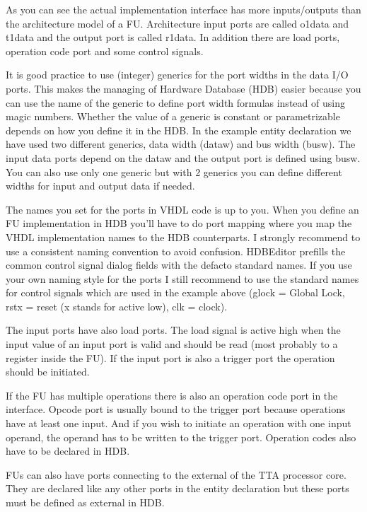\documentclass[twoside]{tceusermanual}
\begin{document}
As you can see the actual implementation interface has more inputs/outputs
than the architecture model of a FU. Architecture input ports are
called o1data and t1data and the output port is called r1data. In addition
there are load ports, operation code port and some control signals.

It is good practice to use (integer) generics for the port widths in the data
I/O ports. This makes the managing of Hardware Database (HDB) easier because
you can use the name of the generic to define port width formulas instead of
using magic numbers. Whether the value of a generic is constant or
parametrizable depends on how you define it in the HDB. In the example
entity declaration we have used two different generics, data width (dataw)
and bus width (busw). The input data ports depend on the dataw and the
output port is defined using busw. You can also use only one generic but
with 2 generics you can define different widths for input and output data if
needed.

The names you set for the ports in VHDL code is up to you. When you define
an FU implementation in HDB you'll have to do port mapping where you map the
VHDL implementation names to the HDB counterparts. I strongly recommend to
use a consistent naming convention to avoid confusion. HDBEditor prefills 
the common control signal dialog fields with the defacto standard
names. If you use your own naming style for the ports I still recommend to
use the standard names for control signals which are used in the example
above (glock = Global Lock, rstx = reset (x stands for active low), clk =
clock).

The input ports have also load ports. The load signal is active high when the
input value of an input port is valid and should be read (most probably to a
register inside the FU). If the input port is also a trigger port the
operation should be initiated.

If the FU has multiple operations there is also an operation code port in the
interface. Opcode port is usually bound to the trigger port because operations
have at least one input. And if you wish to initiate an operation with one
input operand, the operand has to be written to the trigger port. Operation
codes also have to be declared in HDB.

FUs can also have ports connecting to the external of the TTA processor
core. They are declared like any other ports in the entity declaration but
these ports must be defined as external in HDB.
\end{document}
